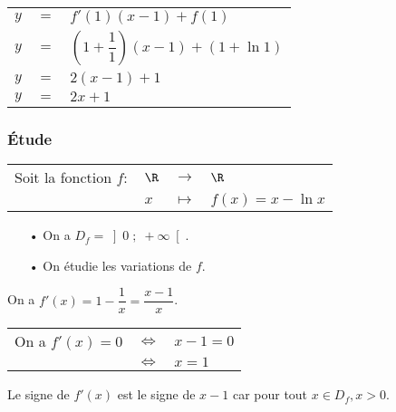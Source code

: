 \vspace*{.3cm}

\begin{tabular}{lll}
$y$ & $=$ & $f'(1)\left(x-1\right)+ f(1)$ \vspace*{.2cm} \\
$y$ & $=$ & $ \left( 1 + \dfrac{1}{1}\right) \left(x-1\right)+ \left(1 + \ln 1\right)$ \vspace*{.2cm} \\
$y$ & $=$ & $2\left(x-1\right) + 1$ \vspace*{.2cm} \\
$y$ & $=$ & $2x +1$ \\
\end{tabular}

\vspace*{-5cm}

\newpage

\vspace*{-2.5cm}

\subsubsection{Étude }

\begin{tabular}{llll}
Soit la fonction  $f :$ & $\R$ & $\longrightarrow$ & $\R$ \\
& $x$ & $\longmapsto$ & $f\left(x\right) = x - \ln x$ \\
\end{tabular}

\begin{itemize}
\item[•] On a $D_{f} = \left]0 \; ; \; +\infty\right[$. 

\item[•] On étudie les variations de $f$. \\
\end{itemize}

On a $f'(x) = 1 - \dfrac{1}{x} = \dfrac{x-1}{x}$. \\

\begin{tabular}{lll}
On a $f'(x) = 0$ & $\Longleftrightarrow$ & $x - 1 = 0$ \\
& $\Longleftrightarrow$ & $x = 1$ \\
\end{tabular}

Le signe de $f'(x)$ est le signe de $x-1$ car pour tout $x \in D_f, x>0$. \\

